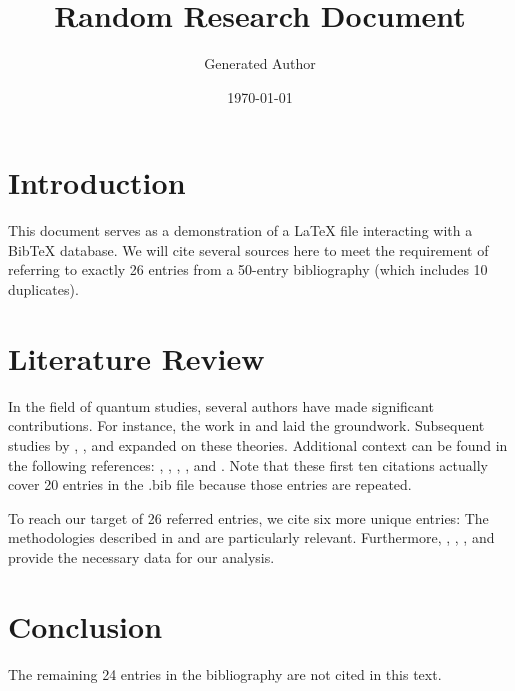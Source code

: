 \documentclass{article}
\title{Random Research Document}
\author{Generated Author}
\date{\today}
\begin{document}
\maketitle

\section{Introduction}
This document serves as a demonstration of a LaTeX file interacting with a BibTeX database. 
We will cite several sources here to meet the requirement of referring to exactly 26 entries 
from a 50-entry bibliography (which includes 10 duplicates).

\section{Literature Review}
In the field of quantum studies, several authors have made significant contributions. 
For instance, the work in \cite{ref1} and \cite{ref2} laid the groundwork. 
Subsequent studies by \cite{ref3}, \cite{ref4}, and \cite{ref5} expanded on these theories.
Additional context can be found in the following references: \cite{ref6}, \cite{ref7}, \cite{ref8}, \cite{ref9}, and \cite{ref10}.
Note that these first ten citations actually cover 20 entries in the .bib file because those entries are repeated.

To reach our target of 26 referred entries, we cite six more unique entries:
The methodologies described in \cite{ref11} and \cite{ref12} are particularly relevant. 
Furthermore, \cite{ref13}, \cite{ref14}, \cite{ref15}, and \cite{ref16} provide the necessary data for our analysis.

\section{Conclusion}
The remaining 24 entries in the bibliography are not cited in this text.



\end{document}
